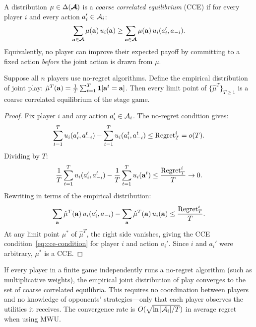 \documentclass[11pt,a4paper]{article}
\begin{document}
\begin{definition}
\label{def:cce}
A distribution $\mu \in \Delta(\boldsymbol{\mathcal{A}})$ is a \emph{coarse
correlated equilibrium} (CCE) if for every player $i$ and every
action $a_i' \in \mathcal{A}_i$:
\begin{equation}
\label{eq:cce-condition}
  \sum_{\mathbf{a} \in \boldsymbol{\mathcal{A}}} \mu(\mathbf{a}) \,
    u_i(\mathbf{a})
  \geq
  \sum_{\mathbf{a} \in \boldsymbol{\mathcal{A}}} \mu(\mathbf{a}) \,
    u_i(a_i', a_{-i}).
\end{equation}
Equivalently, no player can improve their expected payoff by
committing to a fixed action \emph{before} the joint action is
drawn from $\mu$.
\end{definition}

\begin{theorem}
\label{thm:no-regret-cce}
Suppose all $n$ players use no-regret algorithms.  Define the
empirical distribution of joint play:
$\hat{\mu}^T(\mathbf{a}) = \frac{1}{T} \sum_{t=1}^{T}
\mathbf{1}[\mathbf{a}^t = \mathbf{a}]$.
Then every limit point of $\{\hat{\mu}^T\}_{T \geq 1}$ is a coarse
correlated equilibrium of the stage game.
\end{theorem}

\begin{proof}
Fix player $i$ and any action $a_i' \in \mathcal{A}_i$.  The no-regret
condition gives:
\begin{equation}
  \sum_{t=1}^{T} u_i(a_i', a_{-i}^t) -
  \sum_{t=1}^{T} u_i(a_i^t, a_{-i}^t)
  \leq \mathrm{Regret}_T^i = o(T).
\end{equation}
Dividing by $T$:
\begin{equation}
  \frac{1}{T} \sum_{t=1}^{T} u_i(a_i', a_{-i}^t)
  - \frac{1}{T} \sum_{t=1}^{T} u_i(\mathbf{a}^t)
  \leq \frac{\mathrm{Regret}_T^i}{T} \to 0.
\end{equation}
Rewriting in terms of the empirical distribution:
\begin{equation}
  \sum_{\mathbf{a}} \hat{\mu}^T(\mathbf{a}) \, u_i(a_i', a_{-i})
  - \sum_{\mathbf{a}} \hat{\mu}^T(\mathbf{a}) \, u_i(\mathbf{a})
  \leq \frac{\mathrm{Regret}_T^i}{T}.
\end{equation}
At any limit point $\mu^*$ of $\hat{\mu}^T$, the right side vanishes,
giving the CCE condition~\eqref{eq:cce-condition} for player $i$
and action $a_i'$.  Since $i$ and $a_i'$ were arbitrary, $\mu^*$
is a CCE.
\end{proof}

\begin{keyresult}[title={No-Regret to Equilibrium}]
If every player in a finite game independently runs a no-regret
algorithm (such as multiplicative weights), the empirical joint
distribution of play converges to the set of coarse correlated
equilibria.  This requires no coordination between players and no
knowledge of opponents' strategies---only that each player observes
the utilities it receives.  The convergence rate is
$O(\sqrt{\ln|\mathcal{A}_i| / T})$ in average regret when using MWU.
\end{keyresult}
\end{document}
